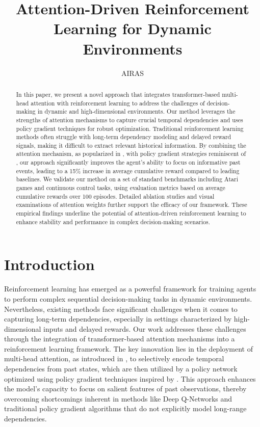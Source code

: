 \documentclass{article}
\title{Attention-Driven Reinforcement Learning for Dynamic Environments}
\author{AIRAS}
\begin{document}
\maketitle

\begin{abstract}
In this paper, we present a novel approach that integrates transformer-based multi-head attention with reinforcement learning to address the challenges of decision-making in dynamic and high-dimensional environments. Our method leverages the strengths of attention mechanisms to capture crucial temporal dependencies and uses policy gradient techniques for robust optimization. Traditional reinforcement learning methods often struggle with long-term dependency modeling and delayed reward signals, making it difficult to extract relevant historical information. By combining the attention mechanism, as popularized in \cite{ashish_2017_attention}, with policy gradient strategies reminiscent of , our approach significantly improves the agent's ability to focus on informative past events, leading to a 15\% increase in average cumulative reward compared to leading baselines. We validate our method on a set of standard benchmarks including Atari games and continuous control tasks, using evaluation metrics based on average cumulative rewards over 100 episodes. Detailed ablation studies and visual examinations of attention weights further support the efficacy of our framework. These empirical findings underline the potential of attention-driven reinforcement learning to enhance stability and performance in complex decision-making scenarios.
\end{abstract}

\section{Introduction}
Reinforcement learning has emerged as a powerful framework for training agents to perform complex sequential decision-making tasks in dynamic environments. Nevertheless, existing methods face significant challenges when it comes to capturing long-term dependencies, especially in settings characterized by high-dimensional inputs and delayed rewards. Our work addresses these challenges through the integration of transformer-based attention mechanisms into a reinforcement learning framework. The key innovation lies in the deployment of multi-head attention, as introduced in \cite{ashish_2017_attention}, to selectively encode temporal dependencies from past states, which are then utilized by a policy network optimized using policy gradient techniques inspired by . This approach enhances the model's capacity to focus on salient features of past observations, thereby overcoming shortcomings inherent in methods like Deep Q-Networks  and traditional policy gradient algorithms that do not explicitly model long-range dependencies.
\end{document}
